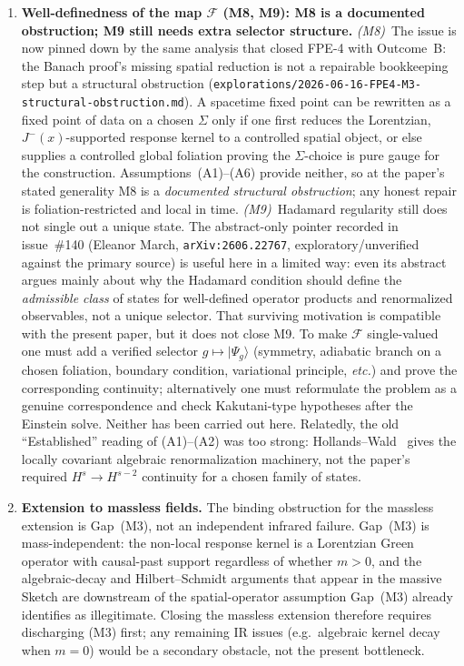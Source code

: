 \documentclass[12pt,a4paper]{article}
\begin{document}
\begin{enumerate}
\item \textbf{Well-definedness of the map $\mathcal{F}$ (M8, M9): M8 is a documented
obstruction; M9 still needs extra selector structure.}
\emph{(M8)}~The issue is now pinned down by the same analysis that closed FPE-4 with
Outcome~B: the Banach proof's missing spatial reduction is not a repairable bookkeeping
step but a structural obstruction
(\texttt{explorations/2026-06-16-FPE4-M3-structural-obstruction.md}). A spacetime fixed
point can be rewritten as a fixed point of data on a chosen $\Sigma$ only if one first
reduces the Lorentzian, $J^-(x)$-supported response kernel to a controlled spatial object,
or else supplies a controlled global foliation proving the $\Sigma$-choice is pure gauge
for the construction. Assumptions~(A1)--(A6) provide neither, so at the paper's stated
generality M8 is a \emph{documented structural obstruction}; any honest repair is
foliation-restricted and local in time. \emph{(M9)}~Hadamard regularity still does not
single out a unique state. The abstract-only pointer recorded in issue~\#140 (Eleanor
March, \texttt{arXiv:2606.22767}, exploratory/unverified against the primary source) is
useful here in a limited way: even its abstract argues mainly about why the Hadamard
condition should define the \emph{admissible class} of states for well-defined operator
products and renormalized observables, not a unique selector. That surviving motivation is
compatible with the present paper, but it does not close M9. To make $\mathcal{F}$
single-valued one must add a verified selector $g\mapsto |\Psi_g\rangle$ (symmetry,
adiabatic branch on a chosen foliation, boundary condition, variational principle, \emph{etc.})
and prove the corresponding continuity; alternatively one must reformulate the problem as a
genuine correspondence and check Kakutani-type hypotheses after the Einstein solve. Neither
has been carried out here. Relatedly, the old ``Established'' reading of (A1)--(A2) was too
strong: Hollands--Wald~\cite{hollands_wald_wick} gives the locally covariant algebraic
renormalization machinery, not the paper's required $H^s\to H^{s-2}$ continuity for a
chosen family of states.

\item \textbf{Extension to massless fields.}
The binding obstruction for the massless extension is Gap~(M3), not an
independent infrared failure. Gap~(M3) is mass-independent: the non-local
response kernel is a Lorentzian Green operator with causal-past support
regardless of whether $m > 0$, and the algebraic-decay and Hilbert--Schmidt
arguments that appear in the massive Sketch are downstream of the spatial-operator
assumption Gap~(M3) already identifies as illegitimate. Closing the massless
extension therefore requires discharging (M3) first; any remaining IR issues
(e.g.\ algebraic kernel decay when $m = 0$) would be a secondary obstacle, not
the present bottleneck.


\end{enumerate}
\end{document}
